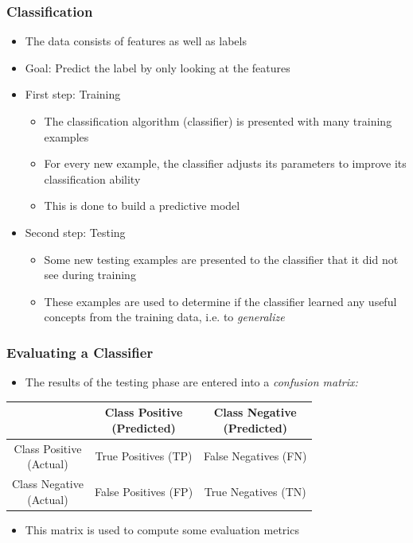 \begin{frame}
  \frametitle{Classification}
  \begin{itemize}
    \item The data consists of features as well as labels
    \item Goal: Predict the label by only looking at the features
    \item First step: Training
      \begin{itemize}
        \item The classification algorithm (classifier) is presented
          with many training examples
        \item For every new example, the classifier adjusts its
          parameters to improve its classification ability
        \item This is done to build a predictive model
      \end{itemize}
    \item Second step: Testing
      \begin{itemize}
        \item Some new testing examples are presented to the
          classifier that it did not see during training
        \item These examples are used to determine if the classifier
          learned any useful concepts from the training data, i.e. to
          \textit{generalize}
      \end{itemize}
  \end{itemize}
\end{frame}

\begin{frame}
  \frametitle{Evaluating a Classifier}
  \begin{itemize}
    \item The results of the testing phase are entered into a
      \textit{confusion matrix:}
  \end{itemize}
  \begin{table}[h]
  \centering
  \renewcommand\theadfont{\bfseries}
  \begin{tabular}{|c|c|c|}
    \hline
    & \thead{Class Positive\\(Predicted)} & \thead{Class Negative\\(Predicted)} \\
    \hline
    \thead{Class Positive\\(Actual)} & True Positives (TP) & False
    Negatives (FN) \\
    \hline
    \thead{Class Negative\\(Actual)} & False Positives (FP) & True
    Negatives (TN) \\
    \hline
  \end{tabular}
  \end{table}
  \begin{itemize}
    \item This matrix is used to compute some evaluation metrics
  \end{itemize}
\end{frame}

